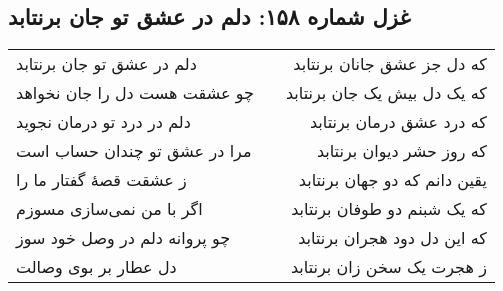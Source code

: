 \begin{center}
\section*{غزل شماره ۱۵۸: دلم در عشق تو جان برنتابد}
\label{sec:158}
\begin{longtable}{l p{0.5cm} r}
دلم در عشق تو جان برنتابد
&&
که دل جز عشق جانان برنتابد
\\
چو عشقت هست دل را جان نخواهد
&&
که یک دل بیش یک جان برنتابد
\\
دلم در درد تو درمان نجوید
&&
که درد عشق درمان برنتابد
\\
مرا در عشق تو چندان حساب است
&&
که روز حشر دیوان برنتابد
\\
ز عشقت قصهٔ گفتار ما را
&&
یقین دانم که دو جهان برنتابد
\\
اگر با من نمی‌سازی مسوزم
&&
که یک شبنم دو طوفان برنتابد
\\
چو پروانه دلم در وصل خود سوز
&&
که این دل دود هجران برنتابد
\\
دل عطار بر بوی وصالت
&&
ز هجرت یک سخن زان برنتابد
\\
\end{longtable}
\end{center}

